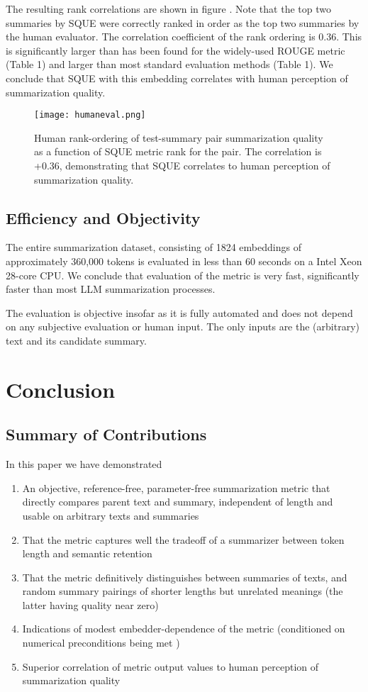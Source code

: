 \documentclass{article}
\begin{document}
{The resulting rank correlations are shown in figure  .
Note that the top two summaries by SQUE were correctly ranked in order as the top
two summaries by the human evaluator.  
The correlation coefficient of the rank ordering is 0.36.
This is significantly larger than has been found for the widely-used ROUGE metric \citet{5071230} (Table 1) and larger than most
standard evaluation methods \cite{supert} (Table 1).
We conclude that SQUE with this embedding correlates with human perception of summarization quality.

\begin{figure}
	\centering
	\texttt{[image: humaneval.png]}
	\caption{Human rank-ordering of test-summary pair summarization quality as a function of SQUE metric rank for the pair.  The correlation is +0.36, demonstrating that SQUE correlates to human perception of summarization quality.}
	\label{fig:humaneval}
\end{figure}

\subsection{Efficiency and Objectivity}

The entire summarization dataset, consisting of 1824 embeddings of approximately 360,000 tokens is evaluated in less than 60 seconds on a Intel Xeon 28-core CPU.
We conclude that evaluation of the metric is very fast, significantly faster than most LLM summarization processes.

The evaluation is objective insofar as it is fully automated and does not depend on any subjective evaluation or human input.
The only inputs are the (arbitrary) text and its candidate summary.

\section{Conclusion}

\subsection{Summary of Contributions}

In this paper we have demonstrated 

\begin{enumerate}
\item An objective, reference-free, parameter-free summarization metric that directly compares parent text and summary, independent of length and usable on arbitrary texts and summaries
\item That the metric captures well the tradeoff of a summarizer between token length and semantic retention
\item That the metric definitively distinguishes between summaries of texts, and random summary pairings of shorter lengths but unrelated meanings (the latter having quality near zero)
\item Indications of modest embedder-dependence of the metric (conditioned on numerical preconditions being met )
\item Superior correlation of metric output values to human perception of summarization quality
\end{enumerate}

}
\end{document}
